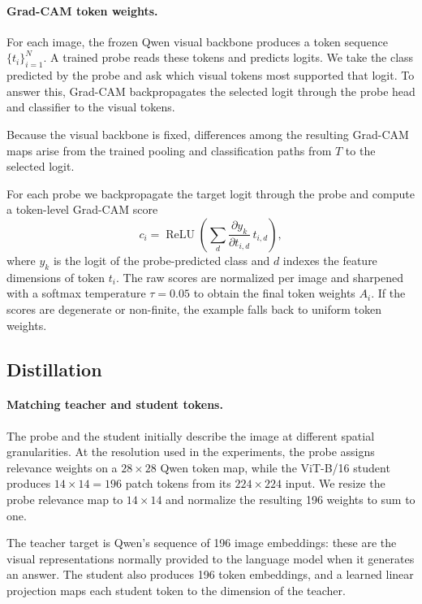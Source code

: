 \documentclass{article}
\begin{document}
\paragraph{Grad-CAM token weights.}
For each image, the frozen Qwen visual backbone produces a token sequence $\{t_i\}_{i=1}^N$.
A trained probe reads these tokens and predicts logits.
We take the class predicted by the probe and ask which visual tokens most supported that logit.
To answer this, Grad-CAM backpropagates the selected logit through the probe head and classifier to the visual tokens.

Because the visual backbone is fixed, differences among the resulting Grad-CAM maps arise from the trained pooling and classification paths from $T$ to the selected logit.

For each probe we backpropagate the target logit through the probe and compute a token-level Grad-CAM score
\begin{equation}
  c_i = \operatorname{ReLU}\left(\sum_d
  \frac{\partial y_k}{\partial t_{i,d}}\,t_{i,d}\right),
\end{equation}
where $y_k$ is the logit of the probe-predicted class and $d$ indexes the feature dimensions of token $t_i$.
The raw scores are normalized per image and sharpened with a softmax temperature $\tau=0.05$ to obtain the final token weights $A_i$.
If the scores are degenerate or non-finite, the example falls back to uniform token weights.


\subsection{Distillation}

\paragraph{Matching teacher and student tokens.}
The probe and the student initially describe the image at different spatial granularities.
At the resolution used in the experiments, the probe assigns relevance weights on a $28\times28$ Qwen token map, while the ViT-B/16 student produces $14\times14=196$ patch tokens from its $224\times224$ input.
We resize the probe relevance map to $14\times14$ and normalize the resulting 196 weights to sum to one.

The teacher target is Qwen's sequence of 196 image embeddings: these are the visual representations normally provided to the language model when it generates an answer.
The student also produces 196 token embeddings, and a learned linear projection maps each student token to the dimension of the teacher.
\end{document}
